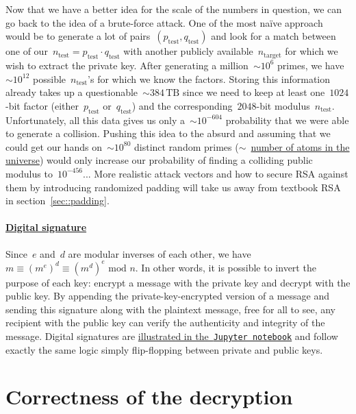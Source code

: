 \documentclass{article}
\begin{document}
\noindent Now that we have a better idea for the scale of the numbers in question, we can go back to the idea of a brute-force attack.  One of the most na\"ive approach would be to generate a lot of pairs~$(p_\text{test}, q_\text{test})$ and look for a match between one of our~$n_\text{test} = p_\text{test} \cdot q_\text{test}$ with another publicly available~$n_\text{target}$ for which we wish to extract the private key. After generating a million~$\sim 10^{6}$ primes, we have~$\sim 10^{12}$ possible~$n_\text{test}$'s for which we know the factors.  Storing this information already takes up a questionable~$\sim 384 \, \text{TB}$ since we need to keep at least one~$1024$-bit factor (either~$p_\text{test}$ or~$q_\text{test}$) and the corresponding~$2048$-bit modulus~$n_\text{test}$.  Unfortunately, all this data gives us only a~$\sim 10^{-604}$ probability that we were able to generate a collision.  Pushing this idea to the absurd and assuming that we could get our hands on~$\sim 10^{80}$ distinct random primes ($\sim$~\href{https://en.wikipedia.org/wiki/Observable_universe#Matter_content_\%E2\%80\%93_number_of_atoms}{number of atoms in the universe}) would only increase our probability of finding a colliding public modulus to~$10^{-456}$...  More realistic attack vectors and how to secure RSA against them by introducing randomized padding will take us away from textbook RSA in section~\ref{sec::padding}.

\paragraph{\href{https://en.wikipedia.org/wiki/Digital_signature}{Digital signature}}  Since~$e$ and~$d$ are modular inverses of each other, we have~$m\equiv (m^e)^d \equiv (m^d)^e \,\,\text{mod}\,\,n$.  In other words, it is possible to invert the purpose of each key: encrypt a message with the private key and decrypt with the public key.  By appending the private-key-encrypted version of a message and sending this signature along with the plaintext message, free for all to see, any recipient with the public key can verify the authenticity and integrity of the message.  Digital signatures are \href{https://github.com/Ranlot/public-key-encryption}{illustrated in the~\texttt{Jupyter notebook}} and follow exactly the same logic simply flip-flopping between private and public keys.

\section{Correctness of the decryption}
\label{sec:certification}
\end{document}
